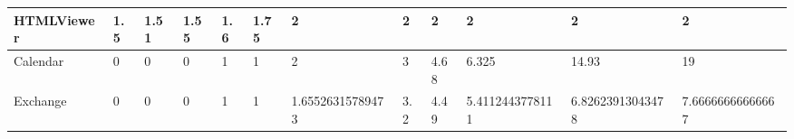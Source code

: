 \newline
\begin{tabular}{|l|l|l|l|l|l|l|l|l|l|l|l|}
\hline
HTMLViewer&1.5&1.51&1.55&1.6&1.75&2&2&2&2&2&2\\
\hline
Calendar&0&0&0&1&1&2&3&4.68&6.325&14.93&19\\
\hline
Exchange&0&0&0&1&1&1.65526315789473&3.2&4.49&5.4112443778111&6.82623913043478&7.66666666666667\\
\hline
\end{tabular}
